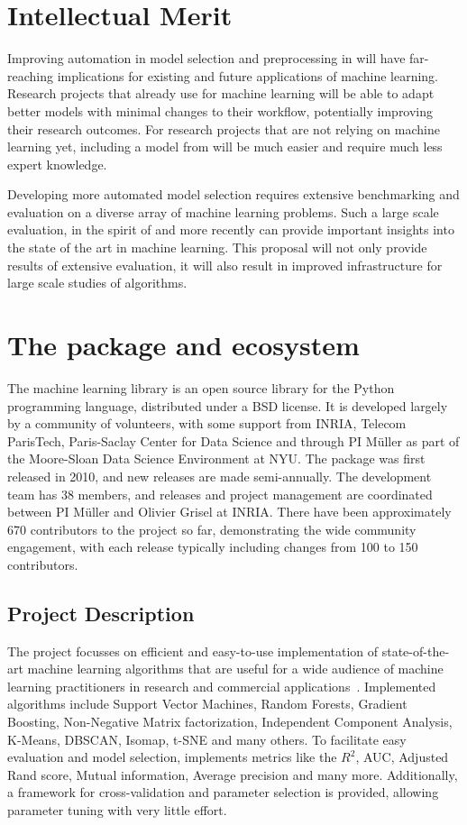 \section{Intellectual Merit}
Improving automation in model selection and preprocessing in \sklearn{} will have far-reaching
implications for existing and future applications of machine learning.
Research projects that already use \sklearn{} for machine learning will be able to adapt better
models with minimal changes to their workflow, potentially improving their research outcomes.
For research projects that are not relying on machine learning yet, including a model
from \sklearn{} will be much easier and require much less expert knowledge.

Developing more automated model selection requires extensive benchmarking and evaluation
on a diverse array of machine learning problems. Such a large scale evaluation,
in the spirit of \textcite{caruana2008empirical, caruana2006empirical} and more
recently \textcite{feurer-nips2015} can provide important insights into the state
of the art in machine learning. This proposal will not only provide results of
extensive evaluation, it will also result in improved infrastructure
for large scale studies of algorithms.

\section{The \sklearn{} package and ecosystem}
The \sklearn{} machine learning library is an open source library for the
Python programming language, distributed under a BSD license.
It is developed largely by a community of volunteers, with some support from
INRIA, Telecom ParisTech, Paris-Saclay Center for Data Science and through PI
M\"uller as part of the Moore-Sloan Data Science Environment at NYU\@.
The package was first released in 2010, and new releases are made semi-annually.
The development team has 38 members, and releases and project management are
coordinated between PI M\"uller and Olivier Grisel at INRIA\@.
There have been approximately 670 contributors to the project so far, demonstrating
the wide community engagement, with each release typically including changes
from 100 to 150 contributors.

\subsection{Project Description}
The \sklearn{} project focusses on efficient and easy-to-use implementation
of state-of-the-art machine learning algorithms that are useful for a wide
audience of machine learning practitioners in research and commercial
applications~\cite{pedregosa2011scikit, buitinck2013api}.
Implemented algorithms include Support Vector Machines, Random Forests, Gradient Boosting,
Non-Negative Matrix factorization, Independent Component Analysis, K-Means, DBSCAN, Isomap,
t-SNE and many others. To facilitate easy evaluation and model selection, \sklearn{}
implements metrics like the $R^2$, AUC, Adjusted Rand score, Mutual information, Average precision
and many more. Additionally, a framework for cross-validation and parameter selection is
provided, allowing parameter tuning with very little effort.

